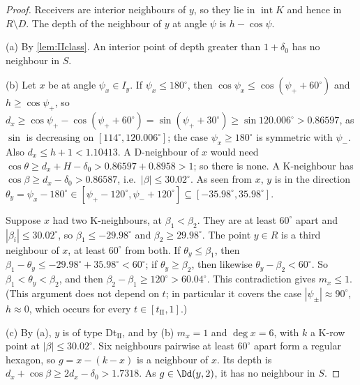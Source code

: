 \begin{proof}
Receivers are interior neighbours of $y$, so they lie in $\operatorname{int}K$ and hence in $R\setminus D$. The depth of the neighbour of $y$ at angle $\psi$ is $h-\cos\psi$.

(a) By \cref{lem:IIclass}. An interior point of depth greater than $1+\delta_0$ has no neighbour in $S$.

(b) Let $x$ be at angle $\psi_x\in I_y$. If $\psi_x\le180^\circ$, then $\cos\psi_x\le\cos(\psi_++60^\circ)$ and $h\ge\cos\psi_+$, so $d_x\ge\cos\psi_+-\cos(\psi_++60^\circ)=\sin(\psi_++30^\circ)\ge\sin120.006^\circ>0.86597$, as $\sin$ is decreasing on $[114^\circ,120.006^\circ]$; the case $\psi_x\ge180^\circ$ is symmetric with $\psi_-$. Also $d_x\le h+1<1.10413$. A D-neighbour of $x$ would need $\cos\theta\ge d_x+H-\delta_0>0.86597+0.8958>1$; so there is none. A K-neighbour has $\cos\beta\ge d_x-\delta_0>0.86587$, i.e.\ $|\beta|\le30.02^\circ$. As seen from $x$, $y$ is in the direction $\theta_y=\psi_x-180^\circ\in[\psi_+-120^\circ,\psi_-+120^\circ]\subseteq[-35.98^\circ,35.98^\circ]$.

Suppose $x$ had two K-neighbours, at $\beta_1<\beta_2$. They are at least $60^\circ$ apart and $|\beta_i|\le30.02^\circ$, so $\beta_1\le-29.98^\circ$ and $\beta_2\ge29.98^\circ$. The point $y\in R$ is a third neighbour of $x$, at least $60^\circ$ from both. If $\theta_y\le\beta_1$, then $\beta_1-\theta_y\le-29.98^\circ+35.98^\circ<60^\circ$; if $\theta_y\ge\beta_2$, then likewise $\theta_y-\beta_2<60^\circ$. So $\beta_1<\theta_y<\beta_2$, and then $\beta_2-\beta_1\ge120^\circ>60.04^\circ$. This contradiction gives $m_x\le1$. (This argument does not depend on $t$; in particular it covers the case $|\psi_\pm|\approx90^\circ$, $h\approx0$, which occurs for every $t\in[t_{\mathrm{II}},1]$.)

(c) By (a), $y$ is of type Dt$_{\mathrm{II}}$, and by (b) $m_x=1$ and $\deg x=6$, with $k$ a K-row point at $|\beta|\le30.02^\circ$. Six neighbours pairwise at least $60^\circ$ apart form a regular hexagon, so $g=x-(k-x)$ is a neighbour of $x$. Its depth is $d_x+\cos\beta\ge2d_x-\delta_0>1.7318$. As $g\in\Dd(y,2)$, it has no neighbour in $S$.
\end{proof}

